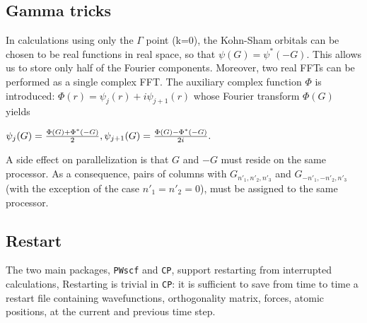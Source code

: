 \documentclass[12pt,a4paper]{article}
\begin{document}
\subsection{Gamma tricks}

In calculations using only the $\Gamma$ point (k=0),
the Kohn-Sham orbitals can be chosen to be real functions in 
real space, so that 
$
  \psi(G) = \psi^*(-G).
$
This allows us to store only half of the Fourier components.
Moreover, two real FFTs can be performed as a single complex FFT.
The auxiliary complex function $\Phi$ is introduced:
$
    \Phi(r) = \psi_j(r)+ i \psi_{j+1}(r)
$
whose Fourier transform $\Phi(G)$ yields

$
   \psi_j    (G) =  {\Phi(G) + \Phi^*(-G)\over 2},
   \psi_{j+1}(G) =  {\Phi(G) - \Phi^*(-G)\over 2i}.
$

A side effect on parallelization is that $G$ and $-G$ must
reside on the same processor. As a consequence, pairs of columns
with $G_{n'_1,n'_2,n'_3}$ and $G_{-n'_1,-n'_2,n'_3}$
(with the exception of the case $n'_1=n'_2=0$),
must be assigned to the same processor.

\subsection{Restart}

The two main packages, \texttt{PWscf} and \texttt{CP}, support
restarting from interrupted calculations, Restarting is trivial
in \texttt{CP}: it is sufficient to save from time to time a 
restart file containing wavefunctions, orthogonality matrix, 
forces, atomic positions, at the current and previous time step.
\end{document}
